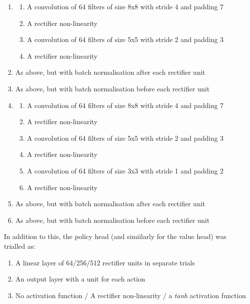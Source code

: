 \documentclass[12pt]{article}
\begin{document}
\begin{enumerate}
    \item \begin{enumerate}
        \item A convolution of 64 filters of size 8x8 with stride 4 and padding 7
        \item A rectifier non-linearity
        \item A convolution of 64 filters of size 5x5 with stride 2 and padding 3
        \item A rectifier non-linearity
    \end{enumerate}    
    \item As above, but with batch normalisation after each rectifier unit
    \item As above, but with batch normalisation before each rectifier unit
    \item \begin{enumerate}
        \item A convolution of 64 filters of size 8x8 with stride 4 and padding 7
        \item A rectifier non-linearity
        \item A convolution of 64 filters of size 5x5 with stride 2 and padding 3
        \item A rectifier non-linearity
        \item A convolution of 64 filters of size 3x3 with stride 1 and padding 2
        \item A rectifier non-linearity
    \end{enumerate}  
    \item As above, but with batch normalisation after each rectifier unit
    \item As above, but with batch normalisation before each rectifier unit  
\end{enumerate}
In addition to this, the policy head (and simiilarly for the value head) was trialled as: 
\begin{enumerate}
    \item A linear layer of 64/256/512 rectifier units in separate trials
    \item An output layer with a unit for each action 
    \item No activation function / A rectifier non-linearity / a \textit{tanh} activation function
\end{enumerate}
\end{document}
